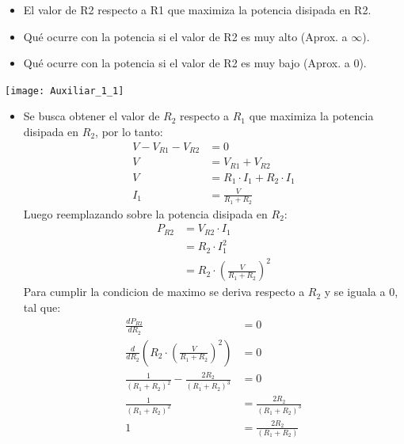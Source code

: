 \documentclass[
  11pt,
  letterpaper,
   addpoints,
   answers
  ]{exam}
\begin{document}
\begin{questions}
    \begin{itemize}
        \item El valor de R2 respecto a R1 que maximiza la potencia disipada en R2.
        \item Qué ocurre con la potencia si el valor de R2 es muy alto (Aprox. a $\infty$).
        \item Qué ocurre con la potencia si el valor de R2 es muy bajo (Aprox. a 0).
    \end{itemize}
    \begin{center}
        \texttt{[image: Auxiliar\_1\_1]}
    \end{center}
    \begin{solution}
        \begin{itemize}
            \item Se busca obtener el valor de $R_2$ respecto a $R_{1}$ que maximiza la potencia disipada en $R_2$, por lo tanto:
            \begin{align}
            V - V_{R1} - V_{R2} &= 0\\
            V &= V_{R1} + V_{R2}\\
            V &= R_{1} \cdot I_{1} + R_{2} \cdot I_{1}\\
            I_{1} &= \frac{V}{R_{1} + R_{2}}
            \end{align}
            Luego reemplazando sobre la potencia disipada en $R_{2}$:
            \begin{align}
                P_{R2} &= V_{R2} \cdot I_{1}\\
                &= R_{2} \cdot I_{1}^{2}\\
                &= R_{2} \cdot \left( \frac{V}{R_{1} + R_{2}} \right)^{2}
            \end{align}
            Para cumplir la condicion de maximo se deriva respecto a $R_{2}$ y se iguala a 0, tal que:
            \begin{align}
                \frac{dP_{R2}}{dR_{2}} &= 0\\
                \frac{d}{dR_{2}} \left( R_{2} \cdot \left( \frac{V}{R_{1} + R_{2}} \right)^{2} \right) &= 0\\
                \frac{1}{(R_{1} + R_{2})^{2}} - \frac{2R_{2}}{(R_{1} + R_{2})^{3}} &= 0\\
                \frac{1}{(R_{1} + R_{2})^{2}} &= \frac{2R_{2}}{(R_{1} + R_{2})^{3}}\\
                1 &= \frac{2R_{2}}{(R_{1}+R_{2})}\\

\end{align}
\end{itemize}
\end{solution}
\end{questions}
\end{document}
